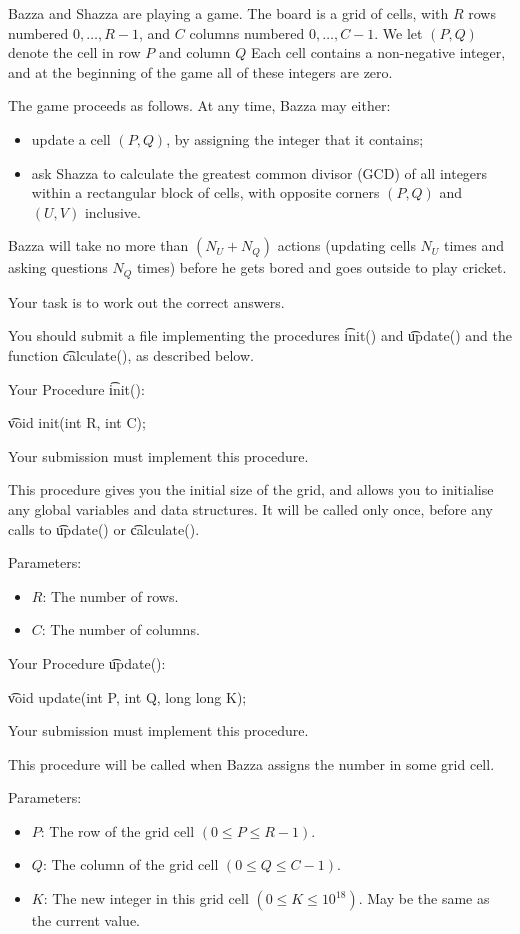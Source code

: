 Bazza and Shazza are playing a game. The board is a grid of cells, with $R$ rows numbered $0, \dots, R - 1$, and $C$ columns numbered $0, \dots, C - 1$. We let $(P, Q)$ denote the cell in row $P$ and column $Q$ Each cell contains a non-negative integer, and at the beginning of the game all of these integers are zero.

The game proceeds as follows. At any time, Bazza may either:

\begin{itemize}
\item update a cell $(P, Q)$, by assigning the integer that it contains;
\item ask Shazza to calculate the greatest common divisor (GCD) of all integers within a rectangular block of cells, with opposite corners $(P, Q)$ and $(U, V)$ inclusive.
\end{itemize}

Bazza will take no more than $(N_U + N_Q)$ actions (updating cells $N_U$ times and asking questions $N_Q$ times) before he gets bored and goes outside to play cricket.

Your task is to work out the correct answers.

You should submit a file implementing the procedures \t{init()} and \t{update()} 
and the function \t{calculate()}, as described below.

Your Procedure \t{init()}:

\t{void init(int R, int C);}

Your submission must implement this procedure.

This procedure gives you the initial size of the grid, and allows you to initialise any global variables and data structures. It will be called only once, before any calls to \t{update()} or \t{calculate()}.

Parameters:
\begin{itemize}
\item $R$: The number of rows.
\item $C$: The number of columns.
\end{itemize}

Your Procedure \t{update()}:

\t{void update(int P, int Q, long long K);}

Your submission must implement this procedure.

This procedure will be called when Bazza assigns the number in some grid cell. 

Parameters:
\begin{itemize}
\item $P$: The row of the grid cell $( 0 \leq P \leq R - 1 )$.
\item $Q$: The column of the grid cell $( 0 \leq Q \leq C - 1 )$.
\item $K$: The new integer in this grid cell $( 0 \leq K \leq 10^{18} )$. May be the same as the current value.
\end{itemize}


